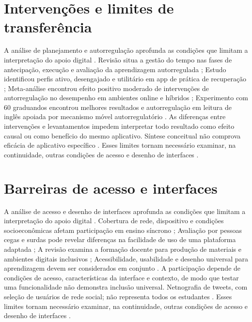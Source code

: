 \clearpage\section{Intervenções e limites de transferência}

A análise de planejamento e autorregulação aprofunda as condições que limitam a interpretação do apoio digital \citep{education_wolters2021} \citep{education_wong2026} \citep{education_xu2022} \citep{education_zheng2016}. Revisão situa a gestão do tempo nas fases de antecipação, execução e avaliação da aprendizagem autorregulada \citep{education_wolters2021}; Estudo identificou perfis ativo, desengajado e utilitário em app de prática de recuperação \citep{education_wong2026}; Meta-análise encontrou efeito positivo moderado de intervenções de autorregulação no desempenho em ambientes online e híbridos \citep{education_xu2022}; Experimento com 60 graduandos encontrou melhores resultados e autorregulação em leitura de inglês apoiada por mecanismo móvel autorregulatório \citep{education_zheng2016}. As diferenças entre intervenções e levantamentos impedem interpretar todo resultado como efeito causal ou como benefício do mesmo aplicativo. Síntese conceitual não comprova eficácia de aplicativo específico \citep{education_wolters2021} \citep{education_wong2026} \citep{education_xu2022} \citep{education_zheng2016}. Esses limites tornam necessário examinar, na continuidade, outras condições de acesso e desenho de interfaces \citep{education_wolters2021} \citep{education_wong2026} \citep{education_xu2022} \citep{education_zheng2016}.

\clearpage\section{Barreiras de acesso e interfaces}

A análise de acesso e desenho de interfaces aprofunda as condições que limitam a interpretação do apoio digital \citep{azionya2021} \citep{batanero2021} \citep{bong2021} \citep{choi2024}. Cobertura de rede, dispositivo e condições socioeconômicas afetam participação em ensino síncrono \citep{azionya2021}; Avaliação por pessoas cegas e surdas pode revelar diferenças na facilidade de uso de uma plataforma adaptada \citep{batanero2021}; A revisão examina a formação docente para produção de materiais e ambientes digitais inclusivos \citep{bong2021}; Acessibilidade, usabilidade e desenho universal para aprendizagem devem ser considerados em conjunto \citep{choi2024}. A participação depende de condições de acesso, características da interface e contexto, de modo que testar uma funcionalidade não demonstra inclusão universal. Netnografia de tweets, com seleção de usuários de rede social; não representa todos os estudantes \citep{azionya2021} \citep{batanero2021} \citep{bong2021} \citep{choi2024}. Esses limites tornam necessário examinar, na continuidade, outras condições de acesso e desenho de interfaces \citep{azionya2021} \citep{batanero2021} \citep{bong2021} \citep{choi2024}.

